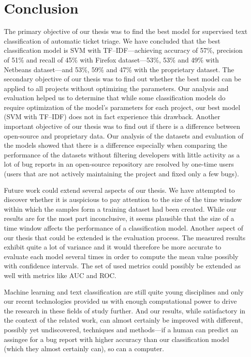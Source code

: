 \chapter{Conclusion}

The primary objective of our thesis was to find the best model for supervised text classification of automatic ticket triage. We have concluded that the best classification model is SVM with TF--IDF---achieving accuracy of 57\%, precision of 51\% and recall of 45\% with Firefox dataset---53\%, 53\% and 49\% with Netbeans dataset---and 53\%, 59\% and 47\% with the proprietary dataset. The secondary objective of our thesis was to find out whether the best model can be applied to all projects without optimizing the parameters. Our analysis and evaluation helped us to determine that while some classification models do require optimization of the model's parameters for each project, our best model (SVM with TF--IDF) does not in fact experience this drawback. Another important objective of our thesis was to find out if there is a difference between open-source and proprietary data. Our analysis of the datasets and evaluation of the models showed that there is a difference especially when comparing the performance of the datasets without filtering developers with little activity as a lot of bug reports in an open-source repository are resolved by one-time users (users that are not actively maintaining the project and fixed only a few bugs).

Future work could extend several aspects of our thesis. We have attempted to discover whether it is auspicious to pay attention to the size of the time window within which the samples form a training dataset had been created. While our results are for the most part inconclusive, it seems plausible that the size of a time window affects the performance of a classification model. Another aspect of our thesis that could be extended is the evaluation process. The measured results exhibit quite a lot of variance and it would therefore be more accurate to evaluate each model several times in order to compute the mean value possibly with confidence intervals. The set of used metrics could possibly be extended as well with metrics like AUC and ROC.

Machine learning and text classification are still quite young disciplines and only our recent technologies provided us with enough computational power to drive the research in these fields of study further. And our results, while satisfactory in the context of the related work, can almost certainly be improved with different, possibly yet undiscovered, techniques and methods---if a human can predict an assingee for a bug report with higher accuracy than our classification model (which they almost certainly can), so can a computer.
